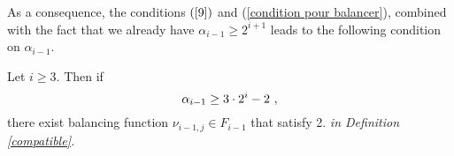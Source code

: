 \documentclass[10pt]{article}
\begin{document}
\s

As a consequence, the conditions $(\ref{9})$ and (\ref{condition pour balancer}), combined with the fact that we already have $\alpha_{i-1} \geq 2^{i+1}$ leads to the following condition on $\alpha_{i-1}$.

\s

\begin{corollary} \label{conditions on alpha_i}
Let $i \geq 3$. Then if 
\begin{equation} \label{final condition on alpha}
\alpha_{i-1} \geq 3\cdot 2^i-2 \ ,
\end{equation}
 there exist balancing function $\nu_{i-1,j} \in F_{i-1}$ that satisfy \rm{2.} \it in Definition \ref{compatible}.
\end{corollary}

\s
\end{document}
